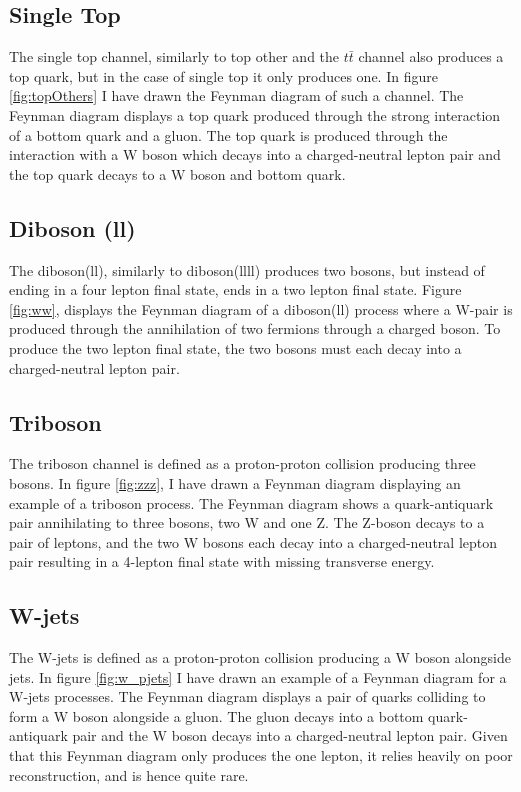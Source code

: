 \subsection*{Single Top}
The single top channel, similarly to top other and the $t\bar{t}$ channel also produces a top quark, but in the case of single top 
it only produces one. In figure \ref{fig:topOthers} I have drawn the Feynman diagram of such a channel. The Feynman diagram displays a
top quark produced through the strong interaction of a bottom quark and a gluon. The top quark is produced through the interaction with a W boson 
which decays into a charged-neutral lepton pair and the top quark decays to a W boson and bottom quark. 

\subsection*{Diboson (ll)}
The diboson(ll), similarly to diboson(llll) produces two bosons, but instead of ending in a four lepton final state, ends in a two lepton final state.
Figure \ref{fig:ww}, displays the Feynman diagram of a diboson(ll) process where a W-pair is produced through the annihilation of two fermions through 
a charged boson. To produce the two lepton final state, the two bosons must each decay into a charged-neutral lepton pair. 

\subsection*{Triboson}
The triboson channel is defined as a proton-proton collision producing three bosons.  In figure \ref{fig:zzz}, I have drawn a Feynman diagram 
displaying an example of a triboson process. The Feynman diagram shows a quark-antiquark pair annihilating to three bosons, two W and one Z. The Z-boson decays 
to a pair of leptons, and the two W bosons each decay into a charged-neutral lepton pair resulting in a 4-lepton final state with missing transverse energy.

\subsection*{W-jets}
The W-jets is defined as a proton-proton collision producing a W boson alongside jets. In figure \ref{fig:w_pjets} I have drawn an example 
of a Feynman diagram for a W-jets processes. The Feynman diagram displays a pair of quarks colliding to form a W boson alongside a gluon. The gluon decays 
into a bottom quark-antiquark pair and the W boson decays into a charged-neutral lepton pair. Given that this Feynman diagram only produces the one lepton, it 
relies heavily on poor reconstruction, and is hence quite rare.

